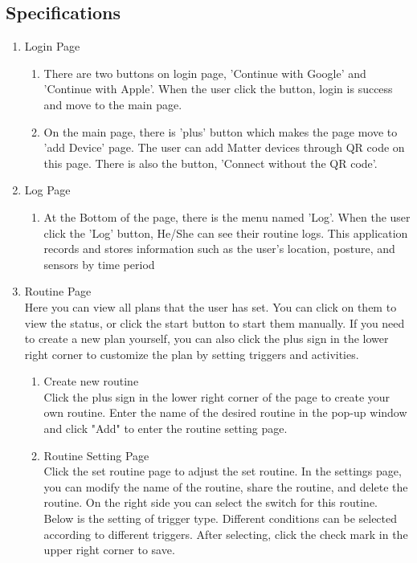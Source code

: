 \documentclass[11pt, conference]{IEEEtran}
\begin{document}
\begin{enumerate}[label=\arabic*.]
\section{\Large{Specifications}}
\begin{enumerate}[label=\arabic*]
    \item {\large{Login Page}}
    \begin{enumerate}[label=\alph*]
        \item There are two buttons on login page, 'Continue with Google' and 'Continue with Apple'. When the user click the button, login is success and move to the main page.
        \item On the main page, there is 'plus' button which makes the page move to 'add Device' page. The user can add Matter devices through QR code on this page. There is also the button, 'Connect without the QR code'. 
    \end{enumerate}
    \item {\large{Log Page}}
    \begin{enumerate}[label=\alph*]
        \item At the Bottom of the page, there is the menu named 'Log'. When the user click the 'Log' button, He/She can see their routine logs. This application records and stores information such as the user's location, posture, and sensors by time period 
    \end{enumerate}
    \item {\large{Routine Page}}\\
    Here you can view all plans that the user has set. You can click on them to view the status, or click the start button to start them manually. If you need to create a new plan yourself, you can also click the plus sign in the lower right corner to customize the plan by setting triggers and activities.\\
    \begin{enumerate}[label=\alph*]
        \item Create new routine\\
            Click the plus sign in the lower right corner of the page to create your own routine. Enter the name of the desired routine in the pop-up window and click "Add" to enter the routine setting page.\\
        \item Routine Setting Page\\
            Click the set routine page to adjust the set routine. In the settings page, you can modify the name of the routine, share the routine, and delete the routine. On the right side you can select the switch for this routine. Below is the setting of trigger type. Different conditions can be selected according to different triggers. After selecting, click the check mark in the upper right corner to save.\\

\end{enumerate}
\end{enumerate}
\end{enumerate}
\end{document}
